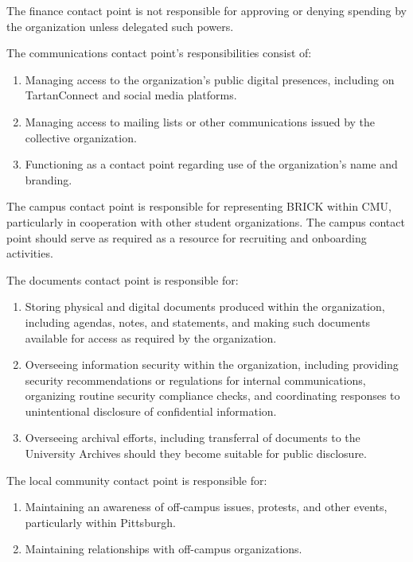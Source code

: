 \documentclass[11pt]{article}
\newcounter{h1}
\newcounter{h2}[h1]
\newcounter{h3}[h2]
\begin{document}
The finance contact point is not responsible for approving or denying spending by the organization unless delegated such powers.


The communications contact point's responsibilities consist of:

\begin{enumerate}
  \item Managing access to the organization's public digital presences, including on TartanConnect and social media platforms.
  \item Managing access to mailing lists or other communications issued by the collective organization.
  \item Functioning as a contact point regarding use of the organization's name and branding.
\end{enumerate}


The campus contact point is responsible for representing BRICK within CMU, particularly in cooperation with other student organizations. The campus contact point should serve as required as a resource for recruiting and onboarding activities.


The documents contact point is responsible for:

\begin{enumerate}
  \item Storing physical and digital documents produced within the organization, including agendas, notes, and statements, and making such documents available for access as required by the organization.
  \item Overseeing information security within the organization, including providing security recommendations or regulations for internal communications, organizing routine security compliance checks, and coordinating responses to unintentional disclosure of confidential information.
  \item Overseeing archival efforts, including transferral of documents to the University Archives should they become suitable for public disclosure.
\end{enumerate}


The local community contact point is responsible for:

\begin{enumerate}
  \item Maintaining an awareness of off-campus issues, protests, and other events, particularly within Pittsburgh.
  \item Maintaining relationships with off-campus organizations.
\end{enumerate}
\end{document}
